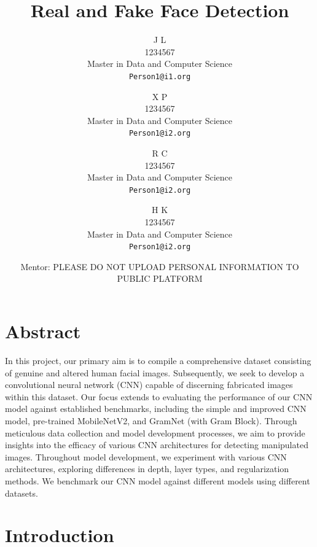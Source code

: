 \documentclass[rebuttal]{cvpr}
\begin{document}
\title{Real and Fake Face Detection}  %


\author{J L\\
1234567\\
Master in Data and Computer Science\\
{\tt\small Person1@i1.org}
\and
X P\\
1234567\\
Master in Data and Computer Science\\
{\tt\small Person1@i2.org}
\and
R C\\
1234567\\
Master in Data and Computer Science\\
{\tt\small Person1@i2.org}
\and
H K \\
1234567\\
Master in Data and Computer Science\\
{\tt\small Person1@i2.org}
\and
Mentor: PLEASE DO NOT UPLOAD PERSONAL INFORMATION TO PUBLIC PLATFORM
}

\maketitle
\thispagestyle{empty}


\section{Abstract}
In this project, our primary aim is to compile a comprehensive dataset consisting of genuine and altered human facial images. Subsequently, we seek to develop a convolutional neural network (CNN) capable of discerning fabricated images within this dataset. Our focus extends to evaluating the performance of our CNN model against established benchmarks, including the simple and improved CNN model, pre-trained MobileNetV2, and GramNet (with Gram Block). Through meticulous data collection and model development processes, we aim to provide insights into the efficacy of various CNN architectures for detecting manipulated images. Throughout model development, we experiment with various CNN architectures, exploring differences in depth, layer types, and regularization methods. We benchmark our CNN model against different models using different datasets.
 

\section{Introduction}
\end{document}
